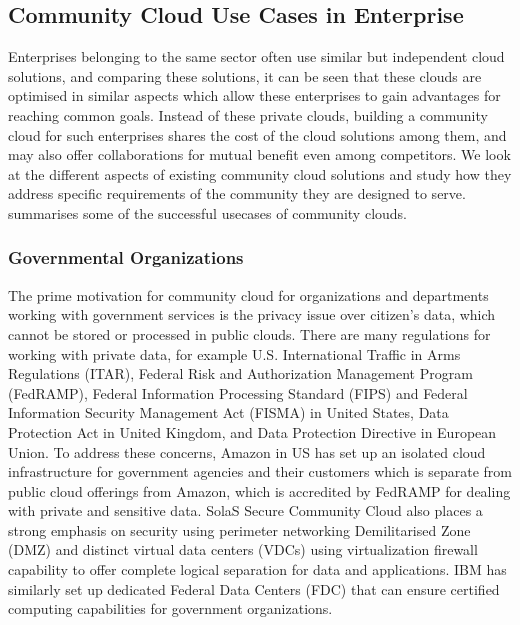 
\subsection{Community Cloud Use Cases in Enterprise}
\label{sec__community_clouds_enterprise}

Enterprises belonging to the same sector often use similar but independent cloud solutions, and comparing these solutions, it can be seen that these clouds are optimised in similar aspects which allow these enterprises to gain advantages for reaching common goals. 
Instead of these private clouds, building a community cloud for such enterprises shares the cost of the cloud solutions among them, and may also offer collaborations for mutual benefit even among competitors.
We look at the different aspects of existing community cloud solutions and study how they address specific requirements of the community they are designed to serve.
 summarises some of the successful usecases of community clouds.

\subsubsection{Governmental Organizations}
The prime motivation for community cloud for organizations and departments working with government services is the privacy issue over citizen's data, which cannot be stored or processed in public clouds.
There are many regulations for working with private data, for example U.S. International Traffic in Arms Regulations (ITAR), Federal Risk and Authorization Management Program (FedRAMP), Federal Information Processing Standard (FIPS) and Federal Information Security Management Act (FISMA) in United States, Data Protection Act in United Kingdom, and Data Protection Directive in European Union.
To address these concerns, Amazon in US has set up an isolated cloud infrastructure for government agencies and their customers which is separate from public cloud offerings from Amazon, which is accredited by FedRAMP for dealing with private and sensitive data. %
SolaS Secure Community Cloud also places a strong emphasis on security using perimeter networking Demilitarised Zone (DMZ) and distinct virtual data centers (VDCs) using virtualization firewall capability to offer complete logical separation for data and applications.
IBM has similarly set up dedicated Federal Data Centers (FDC) that can ensure certified computing capabilities for government organizations. %

